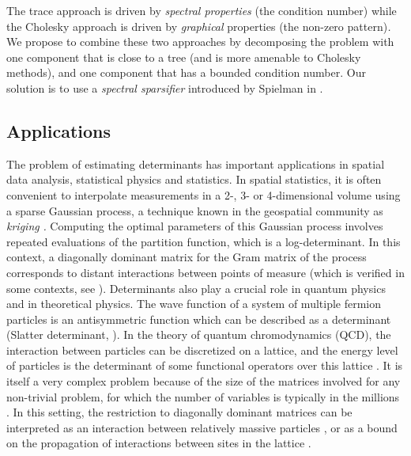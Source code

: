 The trace approach is driven by \emph{spectral properties }(the condition
number) while the Cholesky approach is driven by \emph{graphical }properties\emph{
}(the non-zero pattern)\emph{. }We\emph{ }propose to combine these
two approaches by decomposing the problem with one component that
is close to a tree (and is more amenable to Cholesky methods), and
one component that has a bounded condition number. Our solution is
to use a \emph{spectral sparsifier} introduced by Spielman in \cite{Spielman2008}.


\subsection{Applications}

The problem of estimating determinants has important applications
in spatial data analysis, statistical physics and statistics. In spatial
statistics, it is often convenient to interpolate measurements in
a 2-, 3- or 4-dimensional volume using a sparse Gaussian process,
a technique known in the geospatial community as \emph{kriging }\cite{zhang2010kriging,li2005analysis}\emph{.
}Computing the optimal parameters of this Gaussian process involves
repeated evaluations of the partition function, which is a log-determinant.
In this context, a diagonally dominant matrix for the Gram matrix
of the process corresponds to distant interactions between points
of measure (which is verified in some contexts, see \cite{KelleyPace1997291}).
Determinants also play a crucial role in quantum physics and in theoretical
physics. The wave function of a system of multiple fermion particles
is an antisymmetric function which can be described as a determinant
(Slatter determinant, \cite{atkins2011molecular,lowdin1955quantum}).
In the theory of quantum chromodynamics (QCD), the interaction between
particles can be discretized on a lattice, and the energy level of
particles is the determinant of some functional operators over this
lattice \cite{duncan1998efficient}. It is itself a very complex problem
because of the size of the matrices involved for any non-trivial problem,
for which the number of variables is typically in the millions \cite{bernardson1994monte}.
In this setting, the restriction to diagonally dominant matrices can
be interpreted as an interaction between relatively massive particles
\cite{deForcrand1989516}, or as a bound on the propagation of interactions
between sites in the lattice \cite{bernardson1994monte}.

